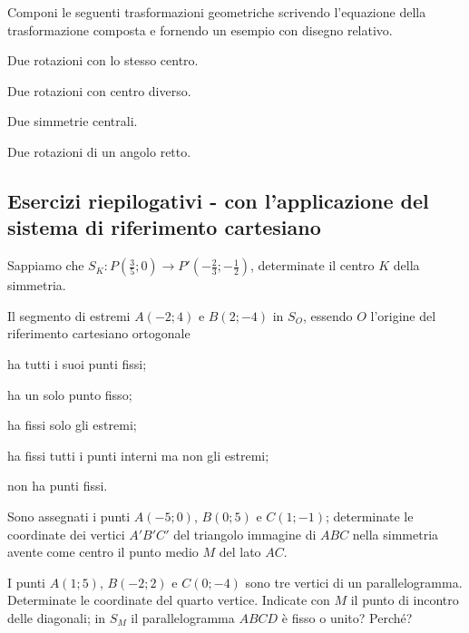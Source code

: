 \begin{esercizio}
\label{ese:8.100} %
Componi le seguenti trasformazioni geometriche scrivendo l'equazione 
della trasformazione composta e fornendo un esempio con disegno 
relativo. 
\begin{enumeratea}
\item Due rotazioni con lo stesso centro.
\item Due rotazioni con centro diverso.
\item Due simmetrie centrali.
\item Due rotazioni di un angolo retto.
\end{enumeratea}
\end{esercizio}


\subsection{Esercizi riepilogativi - con l'applicazione del sistema di riferimento cartesiano}

\begin{esercizio}
	\label{ese:8.7}
	Sappiamo che $S_K:P\left(\frac{3}{5};0\right) \rightarrow 
	P'\left(-\frac{2}{3};-\frac{1}{2}\right)$, determinate il centro $K$ 
	della simmetria. 
\end{esercizio}

\begin{esercizio}
	\label{ese:8.8}
	Il segmento di estremi $A(-2;4)$ e $B(2;-4)$ in $S_O$, essendo $O$ 
	l'origine del riferimento cartesiano ortogonale
	\begin{enumeratea}
		\item ha tutti i suoi punti fissi;
		\item ha un solo punto fisso;
		\item ha fissi solo gli estremi;
		\item ha fissi tutti i punti interni ma non gli estremi;
		\item non ha punti fissi.
	\end{enumeratea}
\end{esercizio}

\begin{esercizio}
	\label{ese:8.9}
	Sono assegnati i punti $A(-5;0)$, $B(0;5)$ e $C(1;-1)$; determinate 
	le coordinate dei vertici $A'B'C'$ del triangolo immagine di $ABC$ 
	nella simmetria avente come centro il punto medio $M$ del lato $AC$.
\end{esercizio}

\begin{esercizio}
	\label{ese:8.10}
	I punti $A(1;5)$, $B(-2;2)$ e $C(0;-4)$ sono tre vertici di un 
	parallelogramma. Determinate le coordinate del quarto vertice. 
	Indicate con $M$ il punto di incontro delle diagonali; in $S_M$ il 
	parallelogramma $ABCD$ è fisso o unito? Perché?
\end{esercizio}

